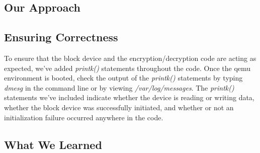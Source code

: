 \documentclass[draftclsnofoot, onecolumn, 10pt, compsoc]{IEEEtran}
\begin{document}
		\subsection{Our Approach}
		\subsection{Ensuring Correctness}
			To ensure that the block device and the encryption/decryption code are acting as expected, we've added \textit{printk()} statements throughout the code. Once the qemu environment is booted, check the output of the \textit{printk()} statements by typing \textit{dmesg} in the command line or by viewing \textit{/var/log/messages}. The \textit{printk()} statements we've included indicate whether the device is reading or writing data, whether the block device was successfully initiated, and whether or not an initialization failure occurred anywhere in the code.
		\subsection{What We Learned}
\end{document}
